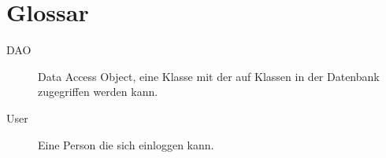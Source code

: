 \section{Glossar}
\begin{description}
    \item[DAO] Data Access Object, eine Klasse mit der auf Klassen in der Datenbank zugegriffen werden kann.

    \item[User] Eine Person die sich einloggen kann.


\end{description}
